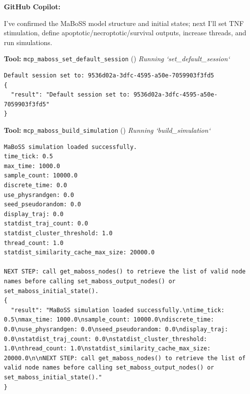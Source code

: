 \documentclass[11pt,a4paper]{article}
\begin{document}
\begin{copilotbox}
\textbf{GitHub Copilot:}

I’ve confirmed the MaBoSS model structure and initial states; next I’ll set TNF stimulation, define apoptotic/necroptotic/survival outputs, increase threads, and run simulations.

\end{copilotbox}
\begin{toolokbox}
\textbf{Tool:} \texttt{mcp\_maboss\_set\_default\_session} (\checkmark)
\textit{Running `set\_default\_session`}
\begin{lstlisting}
Default session set to: 9536d02a-3dfc-4595-a50e-7059903f3fd5
{
  "result": "Default session set to: 9536d02a-3dfc-4595-a50e-7059903f3fd5"
}
\end{lstlisting}
\end{toolokbox}
\begin{toolokbox}
\textbf{Tool:} \texttt{mcp\_maboss\_build\_simulation} (\checkmark)
\textit{Running `build\_simulation`}
\begin{lstlisting}
MaBoSS simulation loaded successfully.
time_tick: 0.5
max_time: 1000.0
sample_count: 10000.0
discrete_time: 0.0
use_physrandgen: 0.0
seed_pseudorandom: 0.0
display_traj: 0.0
statdist_traj_count: 0.0
statdist_cluster_threshold: 1.0
thread_count: 1.0
statdist_similarity_cache_max_size: 20000.0

NEXT STEP: call get_maboss_nodes() to retrieve the list of valid node names before calling set_maboss_output_nodes() or set_maboss_initial_state().
{
  "result": "MaBoSS simulation loaded successfully.\ntime_tick: 0.5\nmax_time: 1000.0\nsample_count: 10000.0\ndiscrete_time: 0.0\nuse_physrandgen: 0.0\nseed_pseudorandom: 0.0\ndisplay_traj: 0.0\nstatdist_traj_count: 0.0\nstatdist_cluster_threshold: 1.0\nthread_count: 1.0\nstatdist_similarity_cache_max_size: 20000.0\n\nNEXT STEP: call get_maboss_nodes() to retrieve the list of valid node names before calling set_maboss_output_nodes() or set_maboss_initial_state()."
}
\end{lstlisting}
\end{toolokbox}
\end{document}
